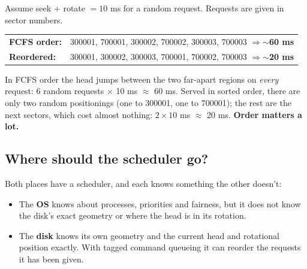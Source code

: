 \documentclass[11pt,a4paper]{article}
\begin{document}
\begin{quizbox}
Assume seek + rotate \(= 10\) ms for a random request. Requests are given in
sector numbers.

\medskip
\renewcommand{\arraystretch}{1.25}
\begin{tabular}{@{}ll@{}}
  \textbf{FCFS order:} & 300001, 700001, 300002, 700002, 300003, 700003
      \quad\(\Rightarrow\)\quad \textbf{\(\sim\)60 ms} \\
  \textbf{Reordered:} & 300001, 300002, 300003, 700001, 700002, 700003
      \quad\(\Rightarrow\)\quad \textbf{\(\sim\)20 ms} \\
\end{tabular}

\medskip
In FCFS order the head jumps between the two far-apart regions on
\emph{every} request: 6 random requests \(\times\) 10 ms \(\approx\) 60 ms.
Served in sorted order, there are only two random positionings (one to
300001, one to 700001); the rest are the next sectors, which cost almost
nothing: \(2 \times 10\) ms \(\approx\) 20 ms. \textbf{Order matters a
lot.}
\end{quizbox}

\subsection{Where should the scheduler go?}

\begin{center}
\end{center}

Both places have a scheduler, and each knows something the other doesn't:
\begin{itemize}
  \item The \textbf{OS} knows about processes, priorities and fairness, but
        it does not know the disk's exact geometry or where the head is in
        its rotation.
  \item The \textbf{disk} knows its own geometry and the current head and
        rotational position exactly. With tagged command queueing it can
        reorder the requests it has been given.
\end{itemize}
\end{document}
